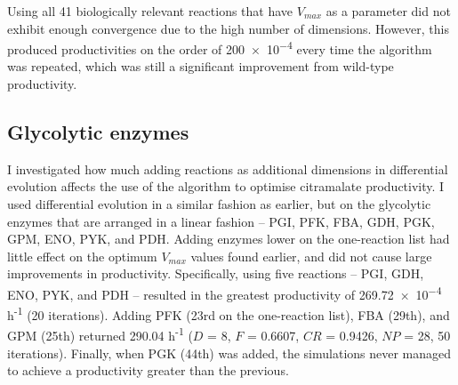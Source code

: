 \documentclass[parskip=full, numbers=noenddot]{scrreprt}
\begin{document}
Using all 41 biologically relevant reactions that have $V_{max}$ as a parameter did not exhibit enough convergence due to the high number of dimensions. However, this produced productivities on the order of \num{200e-4} every time the algorithm was repeated, which was still a significant improvement from wild-type productivity.
\subsection{Glycolytic enzymes}
\label{ssec:glycolytic}


I investigated how much adding reactions as additional dimensions in differential evolution affects the use of the algorithm to optimise citramalate productivity. I used differential evolution in a similar fashion as earlier, but on the glycolytic enzymes that are arranged in a linear fashion --  PGI, PFK, FBA, GDH, PGK, GPM, ENO, PYK, and PDH. Adding enzymes lower on the one-reaction list had little effect on the optimum $V_{max}$ values found earlier, and did not cause large improvements in productivity.
Specifically, using five reactions -- PGI, GDH, ENO, PYK, and PDH -- resulted in the greatest productivity of \num{269.72e-4} h\textsuperscript{-1} (20 iterations). Adding PFK (23rd on the one-reaction list), FBA (29th), and GPM (25th) returned \num{290.04} h\textsuperscript{-1} ($D$ = 8, $F$ = 0.6607, $CR$ = 0.9426, $NP$ = 28, 50 iterations). Finally, when PGK (44th) was added, the simulations never managed to achieve a productivity greater than the previous.

\end{document}
